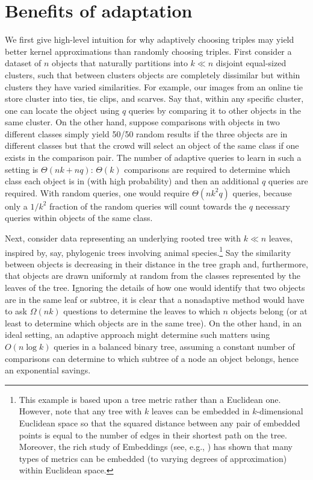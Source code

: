 \documentclass{article}
\begin{document}
\section{Benefits of adaptation}
We first give high-level intuition for why adaptively choosing triples may 
yield better kernel approximations than randomly choosing triples.  
First consider a dataset of $n$ objects that naturally partitions into 
$k \ll n$ disjoint equal-sized
clusters, such that between clusters objects are completely dissimilar
but within clusters they have varied similarities.  For example, our
images from an online tie store cluster into ties, tie clips, and
scarves.  Say that, within any specific cluster, one can locate the object using $q$
queries by comparing it to other objects in the same cluster.  On the
other hand, suppose comparisons with objects in two different classes
simply yield 50/50 random results if the three objects are in
different classes but that the crowd will select an object of the same
class if one exists in the comparison pair.  The number of adaptive
queries to learn in such a setting is $\Theta(nk+nq)$: $\Theta(k)$
comparisons are required to determine which class each object is in
(with high probability) and then an additional $q$ queries are
required.  With random queries, one would require $\Theta(n k^2 q)$
queries, because only a $1/k^2$ fraction of the random queries will
count towards the $q$ necessary queries within objects of the same
class.


Next, consider data representing an underlying rooted tree with $k \ll n$ leaves, inspired by, say, phylogenic trees involving animal species.\footnote{This example is based upon a tree metric rather than a Euclidean one.  However, note that any tree with $k$ leaves can be embedded in $k$-dimensional Euclidean space so that the squared distance between any pair of embedded points is equal to the number of edges in their shortest path on the tree.  Moreover, the rich study of Embeddings (see, e.g., \citealp{IM04}) has shown that many types of metrics can be embedded (to varying degrees of approximation) within Euclidean space.}  Say the similarity between objects is decreasing in their distance in the tree graph and, furthermore, that objects are drawn uniformly at random from the classes represented by the leaves of the tree.  Ignoring the details of how one would identify that two objects are in the same leaf or subtree, it is clear that a nonadaptive method would have to ask $\Omega(n k)$ questions to determine the leaves to which $n$ objects belong (or at least to determine which objects are in the same tree).  On the other hand, in an ideal setting, an adaptive approach might determine such matters using $O(n \log k)$ queries in a balanced binary tree, assuming a constant number of comparisons can determine to which subtree of a node an object belongs, hence an exponential savings.
\end{document}

